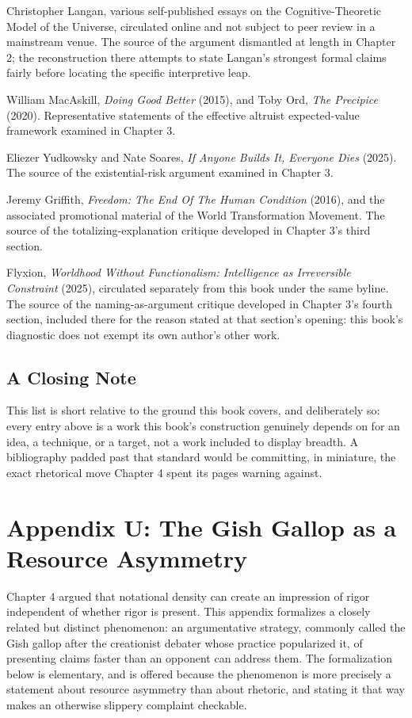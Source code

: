 \documentclass[11pt]{book}
\begin{document}
Christopher Langan, various self-published essays on the Cognitive-Theoretic Model of the Universe, circulated online and not subject to peer review in a mainstream venue. The source of the argument dismantled at length in Chapter 2; the reconstruction there attempts to state Langan's strongest formal claims fairly before locating the specific interpretive leap.

William MacAskill, \emph{Doing Good Better} (2015), and Toby Ord, \emph{The Precipice} (2020). Representative statements of the effective altruist expected-value framework examined in Chapter 3.

Eliezer Yudkowsky and Nate Soares, \emph{If Anyone Builds It, Everyone Dies} (2025). The source of the existential-risk argument examined in Chapter 3.

Jeremy Griffith, \emph{Freedom: The End Of The Human Condition} (2016), and the associated promotional material of the World Transformation Movement. The source of the totalizing-explanation critique developed in Chapter 3's third section.

Flyxion, \emph{Worldhood Without Functionalism: Intelligence as Irreversible Constraint} (2025), circulated separately from this book under the same byline. The source of the naming-as-argument critique developed in Chapter 3's fourth section, included there for the reason stated at that section's opening: this book's diagnostic does not exempt its own author's other work.

\section*{A Closing Note}

This list is short relative to the ground this book covers, and deliberately so: every entry above is a work this book's construction genuinely depends on for an idea, a technique, or a target, not a work included to display breadth. A bibliography padded past that standard would be committing, in miniature, the exact rhetorical move Chapter 4 spent its pages warning against.



\chapter*{Appendix U: The Gish Gallop as a Resource Asymmetry}

Chapter 4 argued that notational density can create an impression of rigor independent of whether rigor is present. This appendix formalizes a closely related but distinct phenomenon: an argumentative strategy, commonly called the Gish gallop after the creationist debater whose practice popularized it, of presenting claims faster than an opponent can address them. The formalization below is elementary, and is offered because the phenomenon is more precisely a statement about resource asymmetry than about rhetoric, and stating it that way makes an otherwise slippery complaint checkable.
\end{document}
